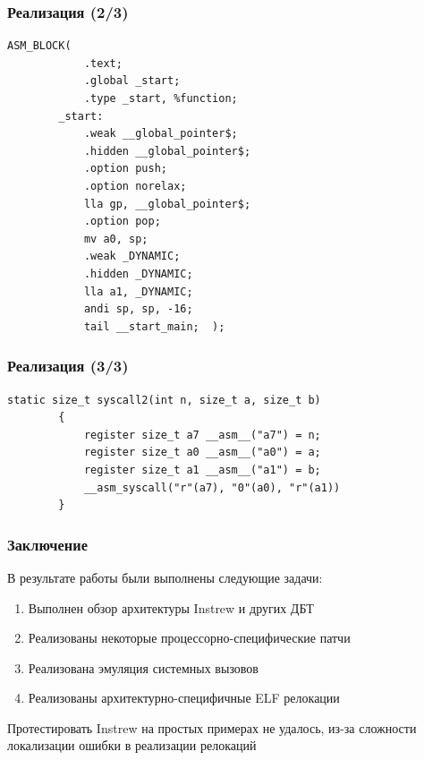 \documentclass{vkr-slides-style}
\begin{document}
\begin{frame}[fragile]
    \frametitle{Реализация (2/3)}
    \vspace{-12pt}
    \begin{lstlisting}[caption={Заголовок}, frame=single, breaklines, basicstyle=\footnotesize]
        ASM_BLOCK(
            .text;
            .global _start;
            .type _start, %function;
        _start:
            .weak __global_pointer$;
            .hidden __global_pointer$;
            .option push;
            .option norelax;
            lla gp, __global_pointer$;
            .option pop;
            mv a0, sp;
            .weak _DYNAMIC;
            .hidden _DYNAMIC;
            lla a1, _DYNAMIC;
            andi sp, sp, -16;
            tail __start_main;  );
    \end{lstlisting}
\end{frame}


\begin{frame}[fragile]
    \frametitle{Реализация (3/3)}
    \begin{lstlisting}[caption={Системный вызов}, frame=single, breaklines, basicstyle=\footnotesize]
        static size_t syscall2(int n, size_t a, size_t b)
        {
            register size_t a7 __asm__("a7") = n;
            register size_t a0 __asm__("a0") = a;
            register size_t a1 __asm__("a1") = b;
            __asm_syscall("r"(a7), "0"(a0), "r"(a1))
        }
    \end{lstlisting}
\end{frame}

\begin{frame}
    \frametitle{Заключение}
    В результате работы были выполнены следующие задачи:
    \vspace{8pt}
    \begin{enumerate}
        \item Выполнен обзор архитектуры Instrew и других ДБТ
        \item Реализованы некоторые процессорно-специфические патчи
        \item Реализована эмуляция системных вызовов
        \item Реализованы архитектурно-специфичные ELF релокации
    \end{enumerate}
    \vspace{8pt}
    Протестировать Instrew на простых примерах не удалось, из-за сложности локализации ошибки в реализации релокаций
\end{frame}
\end{document}
